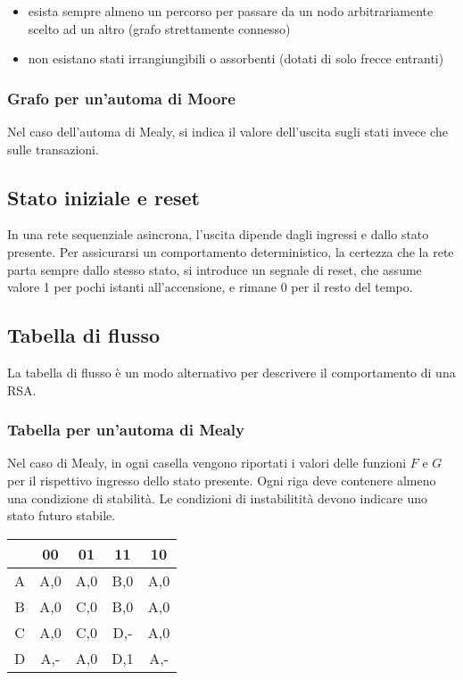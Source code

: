 \documentclass{article}
\begin{document}
\begin{itemize}
    \item esista sempre almeno un percorso per passare da un nodo arbitrariamente scelto ad un altro (grafo strettamente connesso)
    \item non esistano stati irrangiungibili o assorbenti (dotati di solo frecce entranti)
\end{itemize}

\subsubsection{Grafo per un'automa di Moore}

Nel caso dell'automa di Mealy, si indica il valore dell'uscita sugli stati invece che sulle transazioni.

\subsection{Stato iniziale e reset}

In una rete sequenziale asincrona, l'uscita dipende dagli ingressi e dallo stato presente.
Per assicurarsi un comportamento deterministico, la certezza che la rete parta sempre dallo stesso stato, si introduce un segnale di reset, che assume valore 1 per pochi istanti all'accensione, e rimane 0 per il resto del tempo.

\subsection{Tabella di flusso}

La tabella di flusso è un modo alternativo per descrivere il comportamento di una RSA.

\subsubsection{Tabella per un'automa di Mealy}

Nel caso di Mealy, in ogni casella vengono riportati i valori delle funzioni $F$ e $G$ per il rispettivo ingresso dello stato presente.
Ogni riga deve contenere almeno una condizione di stabilità.
Le condizioni di instabilitità devono indicare uno stato futuro stabile.

\begin{center}
\begin{tabular}{ |c|c|c|c|c| }
\hline
& 00 & 01 & 11 & 10 \\
\hline
\hline
A & A,0 & A,0 & B,0 & A,0 \\
B & A,0 & C,0 & B,0 & A,0 \\
C & A,0 & C,0 & D,- & A,0 \\
D & A,- & A,0 & D,1 & A,- \\
\hline
\end{tabular}
\end{center}
\end{document}
